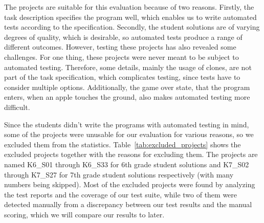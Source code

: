 The projects are suitable for this evaluation because of two reasons.
Firstly, the task description specifies the program well, which enables us to write automated tests according to the specification.
Secondly, the student solutions are of varying degrees of quality,
which is desirable, so automated tests produce a range of different outcomes.
However, testing these projects has also revealed some challenges.
For one thing, these projects were never meant to be subject to automated testing.
Therefore, some details, mainly the usage of clones,
are not part of the task specification, which complicates testing,
since tests have to consider multiple options.
Additionally, the game over state, that the program enters,
when an apple touches the ground, also makes automated testing more difficult.
\parspace

Since the students didn't write the programs with automated testing in mind,
some of the projects were unusable for our evaluation for various reasons, so we excluded them from the statistics.
Table~\ref{tab:excluded_projects} shows the excluded projects together with the reasons for excluding them.
The projects are named K6\_S01 through K6\_S33 for 6th grade student solutions
and K7\_S02 through K7\_S27 for 7th grade student solutions respectively (with many numbers being skipped).
Most of the excluded projects were found by analyzing the test reports and the coverage of our test suite,
while two of them were detected manually from a discrepancy between our test results and the manual scoring,
which we will compare our results to later.


